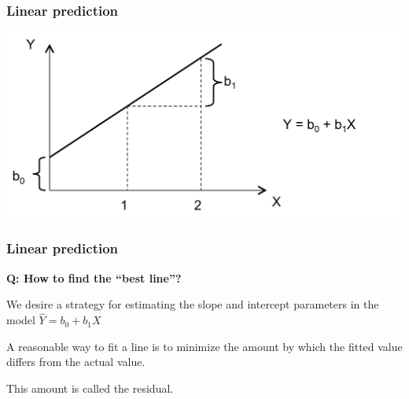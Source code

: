 \documentclass{beamer}
\newcommand{\bl}{\color{lightblue}}
\newcommand{\rd}{\color{burntorange}}
\newcommand{\bk}{\color{black}}
\newcommand{\sk}{\vspace{.5cm}}
\begin{document}
\begin{frame}
\frametitle{Linear prediction} \vspace{-0.5cm}

\begin{center}
\includegraphics[scale=0.65]{figures/straightline}\\
\end{center}
\end{frame}





\begin{frame}
\frametitle{Linear prediction} \vspace{-0.5cm}

\begin{center} \rd
\bf{ \bf Q: How to find the ``best line''?}
\end{center} \bk

\sk
We desire a strategy for estimating the slope and intercept parameters
in the model
$\hat{Y} = b_0 + b_1 X$

\sk
A reasonable way to fit a line is to minimize the amount by which the
\bl fitted value \bk differs from the actual value. 

\sk	This amount is called the \bl residual. \bk 

\end{frame}


\end{document}
